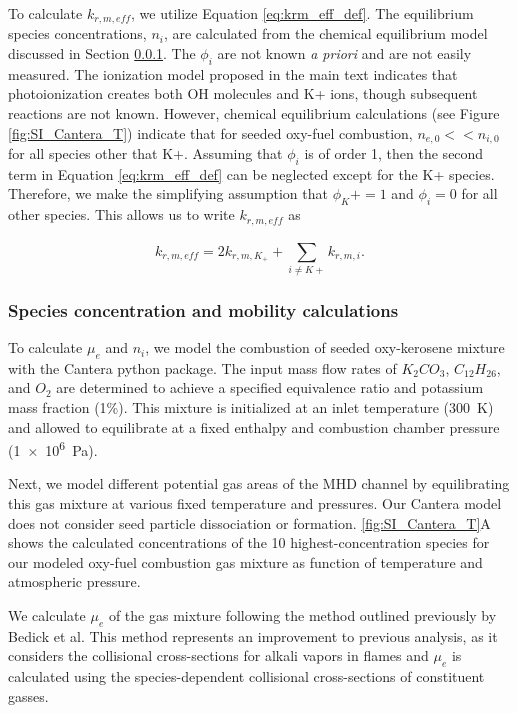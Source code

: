 To calculate $k_{r, m, eff}$, we utilize Equation \ref{eq:krm_eff_def}. The equilibrium species concentrations, $n_i$, are calculated from the chemical equilibrium model discussed in Section \ref{section:species_concentration_mobility_calc}. The $\phi_i$ are not known \emph{a priori} and are not easily measured. The ionization model proposed in the main text indicates that photoionization creates both OH molecules and K+ ions, though subsequent reactions are not known. However, chemical equilibrium calculations (see Figure \ref{fig:SI_Cantera_T}) indicate that for seeded oxy-fuel combustion, $n_{e,0} << n_{i,0}$ for all species other that K+. Assuming that $\phi_i$ is of order 1, then the second term in Equation \ref{eq:krm_eff_def} can be neglected except for the K+ species. Therefore, we make the simplifying assumption that  $\phi_K+ = 1$ and $\phi_i = 0$ for all other species. This allows us to write $k_{r, m, eff}$ as

\begin{equation}
  \label{eq:krm_eff_final}
  k_{r, m, eff} = 2k_{r, m, K_{+}} + \sum_{i \neq K+}^{}k_{r, m, i}.
\end{equation}


\subsubsection{Species concentration and mobility calculations}\label{section:species_concentration_mobility_calc}

To calculate $\mu_e$ and $n_i$, we model the combustion of seeded oxy-kerosene mixture with the Cantera python package.\cite{goodwinCanteraObjectorientedSoftware2021} The input mass flow rates of $K_2CO_3$, $C_{12}H_{26}$, and $O_2$ are determined to achieve a specified equivalence ratio and potassium mass fraction (1\%). This mixture is initialized at an inlet temperature (\SI{300}{\kelvin}) and allowed to equilibrate at a fixed enthalpy and combustion chamber pressure (\SI{1e6}{\pascal}).

Next, we model different potential gas areas of the MHD channel by equilibrating this gas mixture at various fixed temperature and pressures. Our Cantera model does not consider seed particle dissociation or formation. \ref{fig:SI_Cantera_T}A shows the calculated concentrations of the 10 highest-concentration species for our modeled oxy-fuel combustion gas mixture as function of temperature and atmospheric pressure.

We calculate $\mu_e$ of the gas mixture following the method outlined previously by Bedick et al.\cite{bedickCombustionPlasmaElectrical2017a} This method represents an improvement to previous analysis, as it considers the collisional cross-sections for alkali vapors in flames and $\mu_e$ is calculated using the species-dependent collisional cross-sections of constituent gasses.


